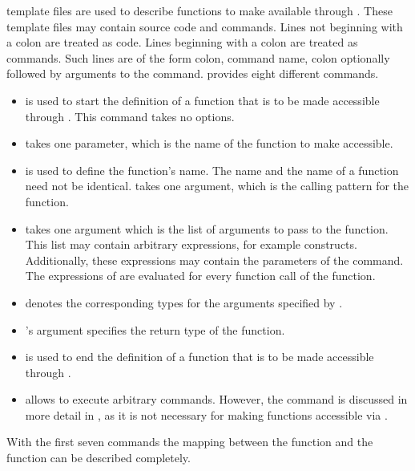 \MathLink template files are used to describe \C functions to make available through \MathLink. These template files may contain \C source code and \MathLink commands. Lines not beginning with a colon are treated as \C code. Lines beginning with a colon are treated as \MathLink commands. Such lines are of the form colon, command name, colon optionally followed by arguments to the command. \MathLink provides eight different commands. 
\begin{itemize}
\item {} is used to start the definition of a function that is to be made accessible through \MathLink. This command takes no options. 
\item {} takes one parameter, which is the name of the \C function to make accessible. 
\item {} is used to define the function's \MathLink name. The \MathLink name and the \C name of a function need not be identical.  takes one argument, which is the \Mathematica calling pattern for the function. 
\item {} takes one argument which is the list of arguments to pass to the \C function. This list may contain arbitrary \Mathematica expressions, for example  constructs. Additionally, these expressions may contain the parameters of the  command. The expressions of  are evaluated for every function call of the \MathLink function.
\item {} denotes the corresponding types for the arguments specified by .
\item {}'s argument specifies the return type of the \C function. 
\item {} is used to end the definition of a function that is to be made accessible through \MathLink. 
\item {} allows to execute arbitrary \Mathematica commands. However, the command  is discussed in more detail in , as it is not necessary for making \C functions accessible via \MathLink.
\end{itemize}

With the first seven commands the mapping between the \C function and the \MathLink function can be described completely.

